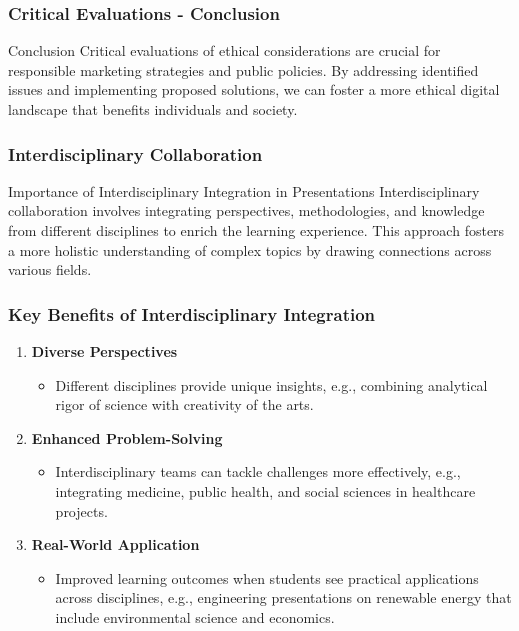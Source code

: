 \documentclass{beamer}
\begin{document}
\begin{frame}[fragile]
    \frametitle{Critical Evaluations - Conclusion}
    \begin{block}{Conclusion}
        Critical evaluations of ethical considerations are crucial for responsible marketing strategies and public policies. 
        By addressing identified issues and implementing proposed solutions, we can foster a more ethical digital landscape that benefits individuals and society.
    \end{block}
\end{frame}

\begin{frame}[fragile]
    \frametitle{Interdisciplinary Collaboration}
    \begin{block}{Importance of Interdisciplinary Integration in Presentations}
        Interdisciplinary collaboration involves integrating perspectives, methodologies, and knowledge from different disciplines to enrich the learning experience. This approach fosters a more holistic understanding of complex topics by drawing connections across various fields.
    \end{block}
\end{frame}

\begin{frame}[fragile]
    \frametitle{Key Benefits of Interdisciplinary Integration}
    \begin{enumerate}
        \item \textbf{Diverse Perspectives}
        \begin{itemize}
            \item Different disciplines provide unique insights, e.g., combining analytical rigor of science with creativity of the arts.
        \end{itemize}

        \item \textbf{Enhanced Problem-Solving}
        \begin{itemize}
            \item Interdisciplinary teams can tackle challenges more effectively, e.g., integrating medicine, public health, and social sciences in healthcare projects.
        \end{itemize}

        \item \textbf{Real-World Application}
        \begin{itemize}
            \item Improved learning outcomes when students see practical applications across disciplines, e.g., engineering presentations on renewable energy that include environmental science and economics.
        \end{itemize}
    \end{enumerate}
\end{frame}
\end{document}
